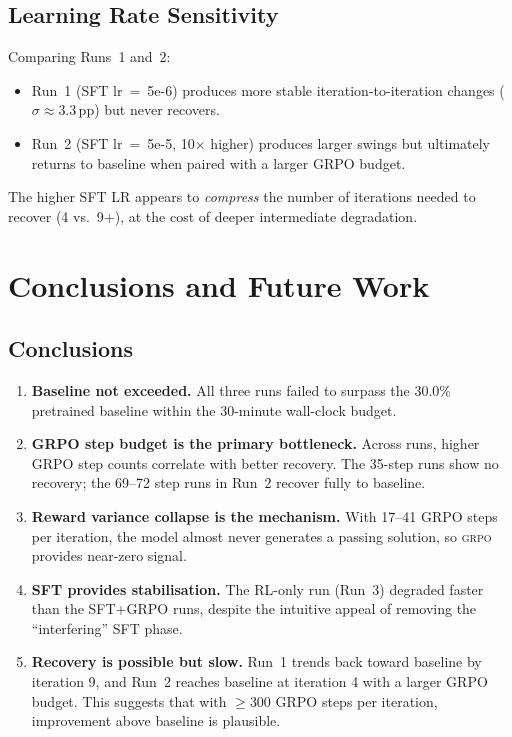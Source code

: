 \documentclass[11pt,a4paper]{article}
\newcommand{\grpo}{\textsc{grpo}}
\begin{document}
\subsection{Learning Rate Sensitivity}

Comparing Runs~1 and~2:
\begin{itemize}[nosep]
  \item Run~1 (SFT lr~=~5e-6) produces more stable iteration-to-iteration
    changes ($\sigma \approx 3.3$\,pp) but never recovers.
  \item Run~2 (SFT lr~=~5e-5, 10$\times$ higher) produces larger swings
    but ultimately returns to baseline when paired with a larger GRPO budget.
\end{itemize}

The higher SFT LR appears to \emph{compress} the number of iterations needed
to recover (4 vs.\ 9+), at the cost of deeper intermediate degradation.

\section{Conclusions and Future Work}

\subsection{Conclusions}

\begin{enumerate}
  \item \textbf{Baseline not exceeded.}
    All three runs failed to surpass the 30.0\% pretrained baseline within the
    30-minute wall-clock budget.

  \item \textbf{GRPO step budget is the primary bottleneck.}
    Across runs, higher GRPO step counts correlate with better recovery.
    The 35-step runs show no recovery; the 69--72 step runs in Run~2 recover
    fully to baseline.

  \item \textbf{Reward variance collapse is the mechanism.}
    With 17--41 GRPO steps per iteration, the model almost never generates a
    passing solution, so \grpo{} provides near-zero signal.

  \item \textbf{SFT provides stabilisation.}
    The RL-only run (Run~3) degraded faster than the SFT+GRPO runs,
    despite the intuitive appeal of removing the ``interfering'' SFT phase.

  \item \textbf{Recovery is possible but slow.}
    Run~1 trends back toward baseline by iteration 9, and Run~2 reaches
    baseline at iteration 4 with a larger GRPO budget. This suggests that with
    $\geq$300 GRPO steps per iteration, improvement above baseline is plausible.
\end{enumerate}
\end{document}
